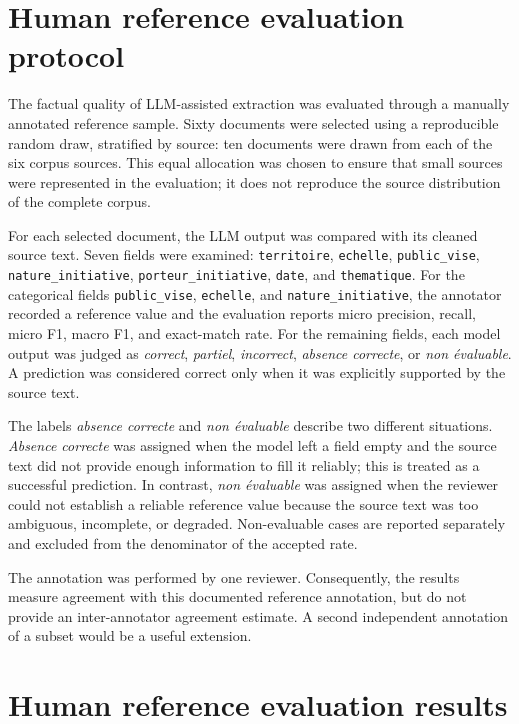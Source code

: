\documentclass[
11pt,
english,
singlespacing,
headsepline,
]{MastersDoctoralThesis}
\begin{document}
\section{Human reference evaluation protocol}

The factual quality of LLM-assisted extraction was evaluated through a manually
annotated reference sample. Sixty documents were selected using a reproducible
random draw, stratified by source: ten documents were drawn from each of the
six corpus sources. This equal allocation was chosen to ensure that small
sources were represented in the evaluation; it does not reproduce the source
distribution of the complete corpus.

For each selected document, the LLM output was compared with its cleaned source
text. Seven fields were examined: \texttt{territoire}, \texttt{echelle},
\texttt{public\_vise}, \texttt{nature\_initiative},
\texttt{porteur\_initiative}, \texttt{date}, and \texttt{thematique}.
For the categorical fields \texttt{public\_vise},
\texttt{echelle}, and \texttt{nature\_initiative}, the annotator recorded a
reference value and the evaluation reports micro precision, recall, micro F1,
macro F1, and exact-match rate. For the remaining fields, each model output was
judged as \textit{correct}, \textit{partiel}, \textit{incorrect},
\textit{absence correcte}, or \textit{non \'{e}valuable}. A prediction was
considered correct only when it was explicitly supported by the source text.

The labels \textit{absence correcte} and \textit{non \'{e}valuable} describe
two different situations. \textit{Absence correcte} was assigned when the model
left a field empty and the source text did not provide enough information to fill
it reliably; this is treated as a successful prediction. In contrast,
\textit{non \'{e}valuable} was assigned when the reviewer could not establish a
reliable reference value because the source text was too ambiguous, incomplete, or
degraded. Non-evaluable cases are reported separately and excluded from the
denominator of the accepted rate.

The annotation was performed by one reviewer. Consequently, the results
measure agreement with this documented reference annotation, but do not provide
an inter-annotator agreement estimate. A second independent annotation of a
subset would be a useful extension.

\section{Human reference evaluation results}
\end{document}
